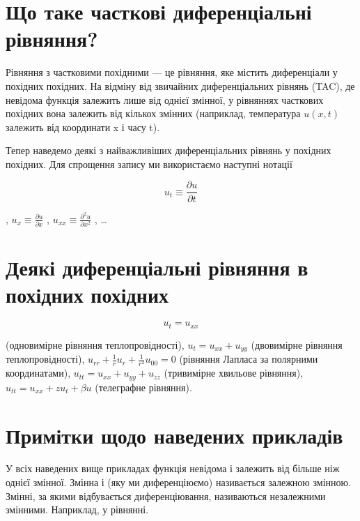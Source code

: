 \documentclass[
  ukrainian,
]{article}
\begin{document}
\section{Що таке часткові диференціальні
рівняння?}\label{ux449ux43e-ux442ux430ux43aux435-ux447ux430ux441ux442ux43aux43eux432ux456-ux434ux438ux444ux435ux440ux435ux43dux446ux456ux430ux43bux44cux43dux456-ux440ux456ux432ux43dux44fux43dux43dux44f}

Рівняння з частковими похідними --- це рівняння, яке містить
диференціали у похідних похідних. На відміну від звичайних
диференціальних рівнянь (TAC), де невідома функція залежить лише від
однієї змінної, у рівняннях часткових похідних вона залежить від кількох
змінних (наприклад, температура \(u(x, t)\) залежить від координати x і
часу t).

Тепер наведемо деякі з найважливіших диференціальних рівнянь у похідних
похідних. Для спрощення запису ми використаємо наступні нотації

\[
u_t \equiv \frac{\partial u}{\partial t}
\]

, \(u_x \equiv \frac{\partial u}{\partial x}\) ,
\(u_{xx} \equiv \frac{\partial^2 u}{\partial x^2}\) , \ldots{}

\section{Деякі диференціальні рівняння в похідних
похідних}\label{ux434ux435ux44fux43aux456-ux434ux438ux444ux435ux440ux435ux43dux446ux456ux430ux43bux44cux43dux456-ux440ux456ux432ux43dux44fux43dux43dux44f-ux432-ux43fux43eux445ux456ux434ux43dux438ux445-ux43fux43eux445ux456ux434ux43dux438ux445}

\[
u_t = u_{xx}
\]

(одновимірне рівняння теплопровідності), \(u_t = u_{xx} + u_{yy}\)
(двовимірне рівняння теплопровідності),
\(u_{rr} + \frac{1}{r}u_r + \frac{1}{r^2}u_{00} = 0\) (рівняння Лапласа
за полярними координатами), \(u_{tt} = u_{xx} + u_{yy} + u_{zz}\)
(тривимірне хвильове рівняння), \(u_{tt} = u_{xx} + zu_t + \beta u\)
(телеграфне рівняння).

\section{Примітки щодо наведених
прикладів}\label{ux43fux440ux438ux43cux456ux442ux43aux438-ux449ux43eux434ux43e-ux43dux430ux432ux435ux434ux435ux43dux438ux445-ux43fux440ux438ux43aux43bux430ux434ux456ux432}

У всіх наведених вище прикладах функція невідома і залежить від більше
ніж однієї змінної. Змінна і (яку ми диференціюємо) називається залежною
змінною. Змінні, за якими відбувається диференціювання, називаються
незалежними змінними. Наприклад, у рівнянні.
\end{document}
